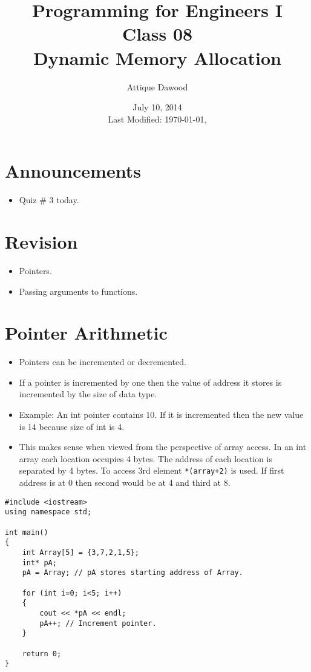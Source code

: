 \documentclass[12pt,a4paper]{article}
\title{Programming for Engineers I\\Class 08\\Dynamic Memory Allocation}
\author{Attique Dawood}
\date{July 10, 2014\\[0.2cm] Last Modified: \today, \currenttime}
\begin{document}
\maketitle
\section{Announcements}
\begin{itemize}
\item Quiz \# 3 today.
\end{itemize}
\section{Revision}
\begin{itemize}
\item Pointers.
\item Passing arguments to functions.
\end{itemize}
\section{Pointer Arithmetic}
\begin{itemize}
\item Pointers can be incremented or decremented.
\item If a pointer is incremented by one then the value of address it stores is incremented by the size of data type.
\item Example: An int pointer contains 10. If it is incremented then the new value is 14 because size of int is 4.
\item This makes sense when viewed from the perspective of array access. In an int array each location occupies 4 bytes. The address of each location is separated by 4 bytes. To access 3rd element \verb|*(array+2)| is used. If first address is at 0 then second would be at 4 and third at 8.
\end{itemize} 
\begin{lstlisting}[caption={Pointer Arithmetic}]
#include <iostream>
using namespace std;

int main()
{
	int Array[5] = {3,7,2,1,5};
	int* pA;
	pA = Array; // pA stores starting address of Array.
	
	for (int i=0; i<5; i++)
	{
		cout << *pA << endl;
		pA++; // Increment pointer.
	}

	return 0;
}
\end{lstlisting}
\end{document}
